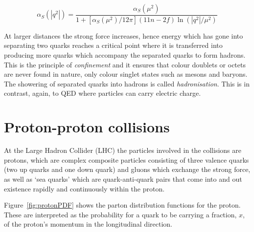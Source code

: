 \begin{equation}
\label{eqn:alphaSQCD}
\alpha_{S}\left( |q^{2}| \right) = \frac{\alpha_{S}\left( \mu^{2} \right)} {1 + \left[ \alpha_{S}\left( \mu^{2} \right)/12\pi \right]\left( 11n -2f \right) \ln \left(|q^{2}|/\mu^{2}\right)}
\end{equation}

At larger distances the strong force increases, hence energy which has gone into separating two quarks reaches a critical point where it is transferred into producing more quarks which accompany the separated quarks to form hadrons. This is the principle of \emph{confinement} and it ensures that colour doublets or octets are never found in nature, only colour singlet states such as mesons and baryons. The showering of separated quarks into hadrons is called \emph{hadronisation}. This is in contrast, again, to QED where particles can carry electric charge.


\section{Proton-proton collisions}
At the Large Hadron Collider (LHC) the particles involved in the collisions are protons, which are complex composite particles consisting of three valence quarks (two up quarks and one down quark) and gluons which exchange the strong force, as well as `sea quarks' which are quark-anti-quark pairs that come into and out existence rapidly and continuously within the proton.

Figure~\ref{fig:protonPDF} shows the parton distribution functions for the proton. These are interpreted as the probability for a quark to be carrying a fraction, $x$, of the proton's momentum in the longitudinal direction.

